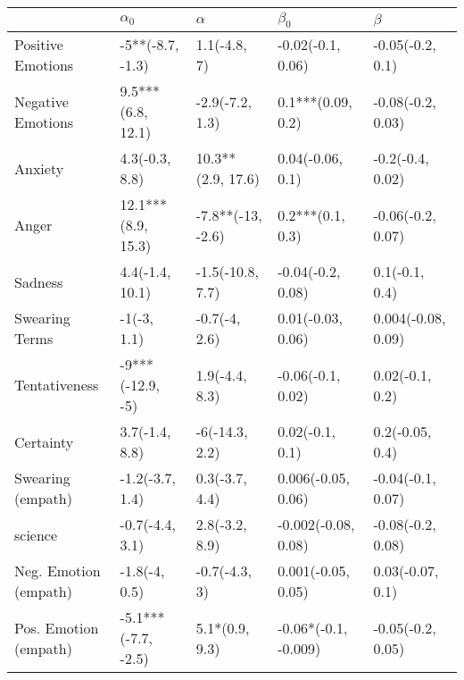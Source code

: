 \begin{tabular}{lllll}
\toprule
{} &           $\alpha_0$ &           $\alpha$ &             $\beta_0$ &             $\beta$ \\
\midrule
Positive Emotions     &     -5**(-8.7, -1.3) &       1.1(-4.8, 7) &     -0.02(-0.1, 0.06) &    -0.05(-0.2, 0.1) \\
Negative Emotions     &    9.5***(6.8, 12.1) &    -2.9(-7.2, 1.3) &     0.1***(0.09, 0.2) &   -0.08(-0.2, 0.03) \\
Anxiety               &       4.3(-0.3, 8.8) &  10.3**(2.9, 17.6) &      0.04(-0.06, 0.1) &    -0.2(-0.4, 0.02) \\
Anger                 &   12.1***(8.9, 15.3) &  -7.8**(-13, -2.6) &      0.2***(0.1, 0.3) &   -0.06(-0.2, 0.07) \\
Sadness               &      4.4(-1.4, 10.1) &   -1.5(-10.8, 7.7) &     -0.04(-0.2, 0.08) &      0.1(-0.1, 0.4) \\
Swearing Terms        &          -1(-3, 1.1) &      -0.7(-4, 2.6) &     0.01(-0.03, 0.06) &  0.004(-0.08, 0.09) \\
Tentativeness         &     -9***(-12.9, -5) &     1.9(-4.4, 8.3) &     -0.06(-0.1, 0.02) &     0.02(-0.1, 0.2) \\
Certainty             &       3.7(-1.4, 8.8) &     -6(-14.3, 2.2) &       0.02(-0.1, 0.1) &     0.2(-0.05, 0.4) \\
Swearing (empath)     &      -1.2(-3.7, 1.4) &     0.3(-3.7, 4.4) &    0.006(-0.05, 0.06) &   -0.04(-0.1, 0.07) \\
science               &      -0.7(-4.4, 3.1) &     2.8(-3.2, 8.9) &   -0.002(-0.08, 0.08) &   -0.08(-0.2, 0.08) \\
Neg. Emotion (empath) &        -1.8(-4, 0.5) &      -0.7(-4.3, 3) &    0.001(-0.05, 0.05) &    0.03(-0.07, 0.1) \\
Pos. Emotion (empath) &  -5.1***(-7.7, -2.5) &     5.1*(0.9, 9.3) &  -0.06*(-0.1, -0.009) &   -0.05(-0.2, 0.05) \\
\bottomrule
\end{tabular}
